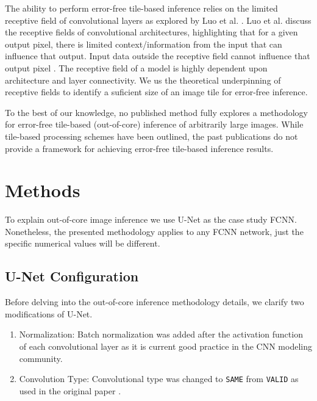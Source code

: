 \documentclass[runningheads]{llncs}
\begin{document}
The ability to perform error-free tile-based inference relies on the limited receptive field of convolutional layers as explored by Luo et al. \cite{Luo2016}. Luo et al. discuss the receptive fields of convolutional architectures, highlighting that for a given output pixel, there is limited context/information from the input that can influence that output. Input data outside the receptive field cannot influence that output pixel \cite{Luo2016}. The receptive field of a model is highly dependent upon architecture and layer connectivity. We us the theoretical underpinning of receptive fields to identify a suficient size of an image tile for error-free inference.  

To the best of our knowledge, no published method fully explores a methodology for error-free tile-based (out-of-core) inference of arbitrarily large images. While tile-based processing schemes have been outlined, the past publications do not provide a framework for achieving error-free tile-based inference results.


\section{Methods}
\label{methods}

To explain out-of-core image inference we use U-Net \cite{Ronneberger2015a} as the case study FCNN. Nonetheless, the presented methodology applies to any FCNN network, just the specific numerical values will be different. 

\subsection{U-Net Configuration}

Before delving into the out-of-core inference methodology details, we clarify two modifications of U-Net. 

\begin{enumerate}
	\item Normalization: Batch normalization \cite{ioffe2015batch} was added after the activation function of each convolutional layer as it is current good practice in the CNN modeling community. 
	\item Convolution Type: Convolutional type was changed to \texttt{SAME} from \texttt{VALID} as used in the original paper \cite{Ronneberger2015a}.
\end{enumerate}
\end{document}
